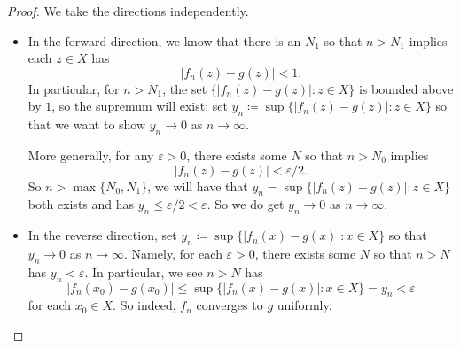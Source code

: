 \begin{proof}
	We take the directions independently.
	\begin{itemize}
		\item In the forward direction, we know that there is an $N_1$ so that $n>N_1$ implies each $z\in X$ has
		\[|f_n(z)-g(z)|<1.\]
		In particular, for $n>N_1$, the set $\{|f_n(z)-g(z)|:z\in X\}$ is bounded above by $1$, so the supremum will exist; set $y_n\coloneqq \sup\{|f_n(z)-g(z)|:z\in X\}$ so that we want to show $y_n\to0$ as $n\to\infty$.
	
		More generally, for any $\varepsilon>0$, there exists some $N$ so that $n>N_0$ implies
		\[|f_n(z)-g(z)|<\varepsilon/2.\]
		So $n>\max\{N_0,N_1\}$, we will have that $y_n=\sup\{|f_n(z)-g(z)|:z\in X\}$ both exists and has $y_n\le\varepsilon/2<\varepsilon$. So we do get $y_n\to0$ as $n\to\infty$.

		\item In the reverse direction, set $y_n\coloneqq \sup\{|f_n(x)-g(x)|:x\in X\}$ so that $y_n\to0$ as $n\to\infty$. Namely, for each $\varepsilon>0$, there exists some $N$ so that $n>N$ has $y_n<\varepsilon$. In particular, we see $n>N$ has
		\[|f_n(x_0)-g(x_0)|\le\sup\{|f_n(x)-g(x)|:x\in X\}=y_n<\varepsilon\]
		for each $x_0\in X$. So indeed, $f_n$ converges to $g$ uniformly.
		\qedhere
	\end{itemize}
\end{proof}

